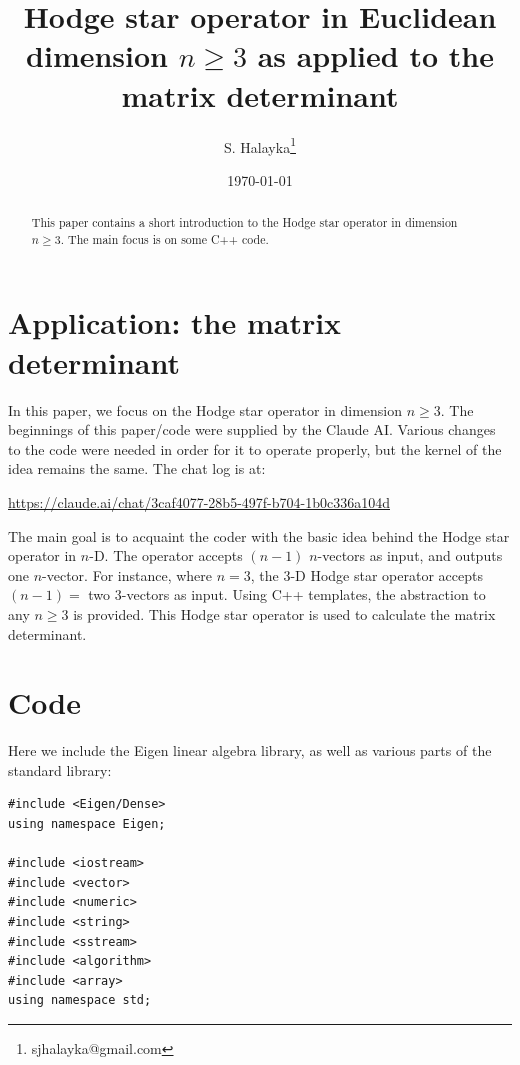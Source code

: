 \documentclass[12pt]{article}
\title{Hodge star operator in Euclidean dimension $n \ge 3$ as applied to the matrix determinant}
\author{S. Halayka\footnote{sjhalayka@gmail.com}}
\date{\today\;\currenttime}
\begin{document}
 
\maketitle

\begin{abstract}
This paper contains a short introduction to the Hodge star operator in dimension $n \ge 3$.
The main focus is on some C++ code.
\end{abstract}




\section{Application: the matrix determinant}

In this paper, we focus on the Hodge star operator in dimension $n \ge 3$.
The beginnings of this paper/code were supplied by the Claude AI.
Various changes to the code were needed in order for it to operate properly, but the kernel of the idea remains the same.
The chat log is at:

\url{https://claude.ai/chat/3caf4077-28b5-497f-b704-1b0c336a104d}

The main goal is to acquaint the coder with the basic idea behind the Hodge star operator in $n$-D. 
The operator accepts $(n - 1)$ $n$-vectors as input, and outputs one $n$-vector.
For instance, where $n = 3$, the $3$-D Hodge star operator accepts $(n - 1) = $ two $3$-vectors as input.
Using C++ templates, the abstraction to any $n \ge 3$ is provided.
This Hodge star operator is used to calculate the matrix determinant.







\section{Code}

Here we include the Eigen linear algebra library, as well as various parts of the standard library:
\begin{lstlisting}
#include <Eigen/Dense>
using namespace Eigen;

#include <iostream>
#include <vector>
#include <numeric>
#include <string>
#include <sstream>
#include <algorithm>
#include <array>
using namespace std;
\end{lstlisting}
\end{document}
